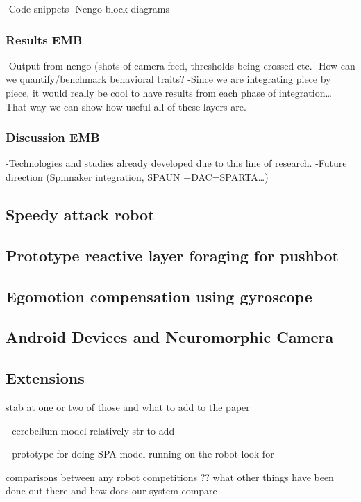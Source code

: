 -Code snippets -Nengo block diagrams


\subsubsection{Results EMB }

-Output from nengo (shots of camera feed, thresholds being crossed
etc. -How can we quantify/benchmark behavioral traits? -Since we are
integrating piece by piece, it would really be cool to have results
from each phase of integration\ldots{} That way we can show how useful
all of these layers are.


\subsubsection{Discussion EMB}

-Technologies and studies already developed due to this line of research.
-Future direction (Spinnaker integration, SPAUN +DAC=SPARTA\ldots{}) 


\subsection{Speedy attack robot}


\subsection{Prototype reactive layer foraging for pushbot}


\subsection{Egomotion compensation using gyroscope}


\subsection{Android Devices and Neuromorphic Camera}


\subsection{Extensions }

stab at one or two of those and what to add to the paper 

- cerebellum model relatively str to add 

- prototype for doing SPA model running on the robot look for 

comparisons between any robot competitions ?? what other things have
been done out there and how does our system compare 
